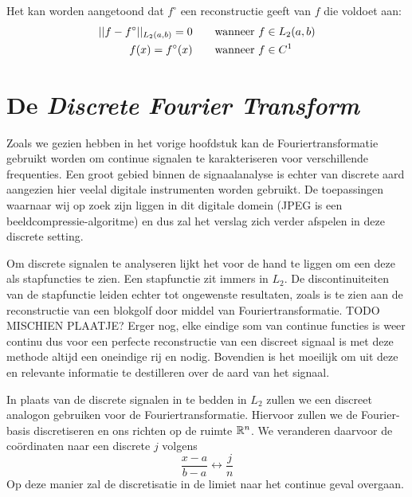 Het kan worden aangetoond dat $f^\circ$ een reconstructie geeft van $f$ die voldoet aan: \cite{fourier-rec} 
\begin{eqnarray}
  {||f-f^\circ||_{L_2(a,b)}}=0 \quad\quad \text{wanneer }& f\in L_2(a,b) \\
  f(x) = f^\circ(x) \quad\quad \text{wanneer }& f \in C^1 
\end{eqnarray}

\section{De \emph{Discrete Fourier Transform}}
Zoals we gezien hebben in het vorige hoofdstuk kan de Fouriertransformatie gebruikt worden om continue signalen te karakteriseren voor verschillende frequenties. Een groot gebied binnen de signaalanalyse is echter van discrete aard aangezien hier veelal digitale instrumenten worden gebruikt. De toepassingen waarnaar wij op zoek zijn liggen in dit digitale domein (JPEG is een beeldcompressie-algoritme) en dus zal het verslag zich verder afspelen in deze discrete setting.

Om discrete signalen te analyseren lijkt het voor de hand te liggen om een deze als stapfuncties te zien. Een stapfunctie zit immers in $L_2$. De discontinuiteiten van de stapfunctie leiden echter tot ongewenste resultaten, zoals is te zien aan de reconstructie van een blokgolf door middel van Fouriertransformatie. TODO MISCHIEN PLAATJE?
Erger nog, elke eindige som van continue functies is weer continu dus voor een perfecte reconstructie van een discreet signaal is met deze methode altijd een oneindige rij \coefficient en nodig. Bovendien is het moeilijk om uit deze \coefficient en relevante informatie te destilleren over de aard van het signaal.

In plaats van de discrete signalen in te bedden in $L_2$ zullen we een discreet analogon gebruiken voor de Fouriertransformatie.
Hiervoor zullen we de Fourier-basis discretiseren en ons richten op de ruimte $\mathbb{R}^n$.
We veranderen daarvoor de co\"ordinaten naar een discrete $j$ volgens
\[
\frac{x-a}{b-a} \leftrightarrow \frac j n 
\]
Op deze manier zal de discretisatie in de limiet naar het continue geval overgaan. 

